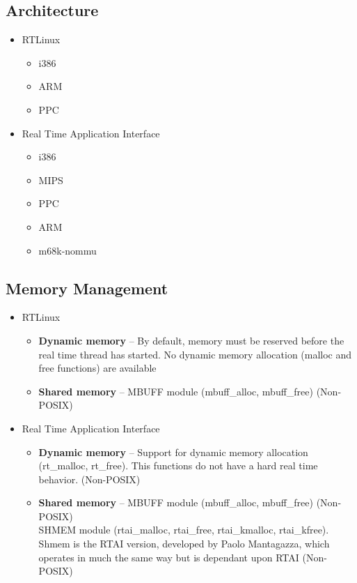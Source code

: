\documentclass[paper=letter, fontsize=12pt]{article}
\newcommand\rtai{Real Time Application Interface}
\newcommand\rtlinux{RTLinux}
\begin{document}
\subsection{Architecture}
    \begin{itemize}
        \item \rtlinux
        \begin{itemize}
            \item i386
            \item ARM
            \item PPC
        \end{itemize}
        \item \rtai
        \begin{itemize}
            \item i386
            \item MIPS
            \item PPC
            \item ARM
            \item m68k-nommu
        \end{itemize}
    \end{itemize}
    
    \subsection{Memory Management}
    \begin{itemize}
        \item \rtlinux
        \begin{itemize}
            \item \textbf{Dynamic memory} -- By default, memory must be reserved before the real time thread has started. No dynamic memory allocation (malloc and free functions) are available
            \item \textbf{Shared memory} -- MBUFF module (mbuff\_alloc, mbuff\_free) (Non-POSIX)
        \end{itemize}
        \item \rtai
        \begin{itemize}
            \item \textbf{Dynamic memory} -- Support for dynamic memory allocation (rt\_malloc, rt\_free). This functions do not have a hard real time behavior. (Non-POSIX)
            \item \textbf{Shared memory} -- MBUFF module (mbuff\_alloc, mbuff\_free) (Non-POSIX)
            \\ SHMEM module (rtai\_malloc, rtai\_free, rtai\_kmalloc, rtai\_kfree). Shmem is the RTAI version, developed by Paolo Mantagazza, which operates in much the same way but is dependant upon RTAI (Non-POSIX)
        \end{itemize}
    \end{itemize}
    
\end{document}
